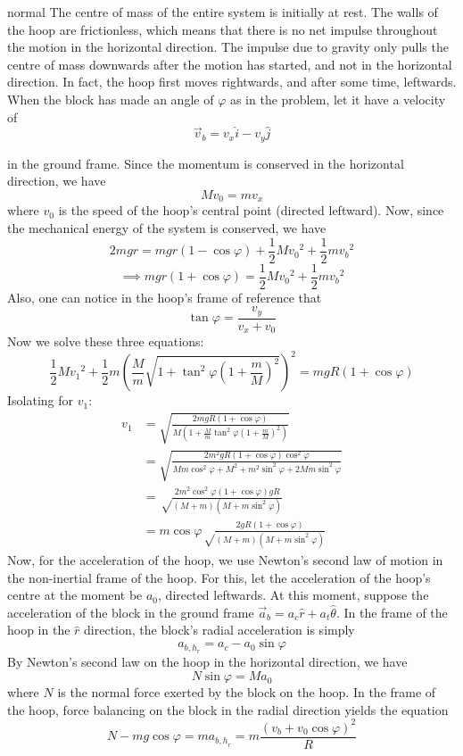 \begin{solution}{normal}
The centre of mass of the entire system is initially at rest. The walls of the hoop are frictionless, which means that there is no net impulse throughout the motion in the horizontal direction. The impulse due to gravity only pulls the centre of mass downwards after the motion has started, and not in the horizontal direction. In fact, the hoop first moves rightwards, and after some time, leftwards. When the block has made an angle of $\varphi$ as in the problem, let it have a velocity of
$$\vec{v}_{b} = v_x \hat{i} - v_y \hat{j}$$

in the ground frame. Since the momentum is conserved in the horizontal direction, we have
$$M v_0 = mv_x $$
where $v_0$ is the speed of the hoop's central point (directed leftward). Now, since the mechanical energy of the system is conserved, we have
$$2 mg r = mgr (1-\cos{\varphi}) + \frac{1}{2} M {v_0}^2 + \frac{1}{2} m {v_b}^2$$$$\implies mgr(1+ \cos{\varphi}) = \frac{1}{2} M {v_0}^2 + \frac{1}{2} m {v_b}^2$$
Also, one can notice in the hoop's frame of reference that
$$\tan{\varphi} = \frac{v_y}{v_x + v_0}$$
Now we solve these three equations:
$$\frac{1}{2} M {v_1}^2 + \frac{1}{2} m {(\frac{M}{m} \sqrt{1+\tan^2{\varphi} {(1+\frac{m}{M})}^2})}^2 = mgR(1+\cos{\varphi})$$
Isolating for $v_1$:
\begin{align*}
v_1 &= \sqrt{\frac{2mgR(1+\cos{\varphi})}{M(1+\frac{M}{m} \tan^2{\varphi} {(1+\frac{m}{M})}^2)}}  \\
&= \sqrt{\frac{2m^2gR(1+\cos{\varphi})\cos^2{\varphi}}{Mm \cos^2{\varphi} + M^2 + m^2 \sin^2{\varphi}+ 2Mm \sin^2{\varphi}}} \\ 
&= \sqrt\frac{2m^2\cos^2\varphi (1+\cos\varphi)gR}{(M+m)(M+m\sin^2\varphi)} \\
&=\boxed{m \cos{\varphi} \sqrt\frac{2gR(1+\cos\varphi)}{(M+m)(M+m\sin^2\varphi)}}
\end{align*}Now, for the acceleration of the hoop, we use Newton's second law of motion in the non-inertial frame of the hoop. For this, let the acceleration of the hoop's centre at the moment be $a_0$, directed leftwards. At this moment, suppose the acceleration of the block in the ground frame $\vec{a}_b = a_c \hat{r} + a_t \hat{\theta}$. In the frame of the hoop in the $\hat{r}$ direction, the block's radial acceleration is simply$$a_{{b,h}_r} = a_c - a_0 \sin{\varphi}$$By Newton's second law on the hoop in the horizontal direction, we have$$N \sin{\varphi} = M a_0$$where $N$ is the normal force exerted by the block on the hoop. In the frame of the hoop, force balancing on the block in the radial direction yields the equation$$N- mg\cos{\varphi} = m a_{{b,h}_r} = m \frac{{(v_b+v_0 \cos{\varphi})}^2}{R}$$

\end{solution}
